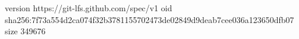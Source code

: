 version https://git-lfs.github.com/spec/v1
oid sha256:7f73a554d2ca074f32b3781155702473de02849d9deab7cee036a123650dfb07
size 349676
